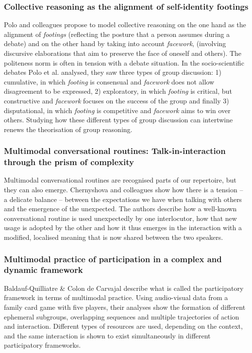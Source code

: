\documentclass[output=paper]{langscibook}
\begin{document}
\subsubsection{Collective reasoning as the alignment of self-identity footings}

Polo and colleagues propose to model collective reasoning on the one hand as the alignment of \textit{footings} (reflecting the posture that a person assumes during a debate) and on the other hand by taking into account \textit{facework}, (involving discursive elaborations that aim to preserve the face of oneself and others). The politeness norm is often in tension with a debate situation. In the socio-scientific debates Polo et al. analysed, they saw three types of group discussion:
1) cumulative, in which \textit{footing} is consensual and \textit{facework} does not allow disagreement to be expressed,
2) exploratory, in which \textit{footing} is critical, but constructive and \textit{facework} focuses on the success of the group and finally
3) disputational, in which \textit{footing} is competitive and \textit{facework} aims to win over others. Studying how these different types of group discussion can intertwine renews the theorisation of group reasoning.

\subsubsection{Multimodal conversational routines: Talk-in-interaction through the prism of complexity}

Multimodal conversational routines are recognised parts of our repertoire, but they can also emerge. Chernyshova and colleagues show how there is a tension -- a delicate balance -- between the expectations we have when talking with others and the emergence of the unexpected. The authors describe how a well-known conversational routine is used unexpectedly by one interlocutor, how that new usage is adopted by the other and how it thus emerges in the interaction with a modified, localised meaning that is now shared between the two speakers. 

\subsubsection{Multimodal practice of participation in a complex and dynamic framework}

Baldauf-Quilliatre \& Colon de Carvajal describe what is called the participatory framework in terms of multimodal practice. Using audio-visual data from a family card game with five players, their analyses show the formation of different ephemeral subgroups, overlapping sequences and multiple trajectories of action and interaction. Different types of resources are used, depending on the context, and the same interaction is shown to exist simultaneously in different participatory frameworks. 
\end{document}
